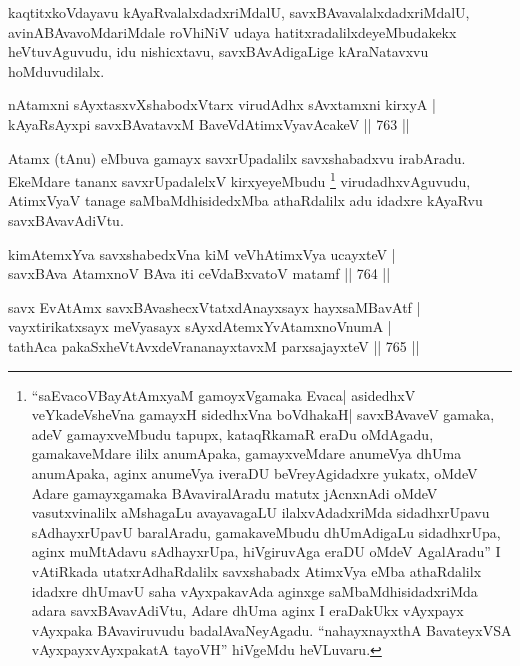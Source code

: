 \begin{artha}
kaqtitxkoVdayavu kAyaRvalalxdadxriMdalU, savxBAvavalalxdadxriMdalU, avinABAvavoMdariMdale roVhiNiV udaya hatitxradalilxdeyeMbudakekx heVtuvAguvudu, idu nishicxtavu, savxBAvAdigaLige kAraNatavxvu hoMduvudilalx.
\end{artha}


\begin{shl}
nA\s \s tamxni sAyxtasxvXshabodxV\s tarx virudAdhx sAvxtamxni kirxyA | \\
kAyaRsAyxpi savxBAvatavxM BaveVdAtimxVyavAcakeV \hfill||  763 || 
\end{shl}

\begin{artha}
Atamx (tAnu) eMbuva gamayx savxrUpadalilx savxshabadxvu irabAradu. EkeMdare tananx savxrUpadalelxV kirxyeyeMbudu \footnote{``saEvacoVBayAtAmx\s yaM gamoyxVgamaka Evaca| asidedhxV veYkadeVsheVna gamayxH sidedhxVna boVdhakaH| savxBAvaveV gamaka, adeV gamayxveMbudu tapupx, kataqRkamaR eraDu oMdAgadu, gamakaveMdare ililx anumApaka, gamayxveMdare anumeVya dhUma anumApaka, aginx anumeVya iveraDU beVreyAgidadxre yukatx, oMdeV Adare gamayxgamaka BAvaviralAradu matutx jAcnxnAdi oMdeV vasutxvinalilx aMshagaLu avayavagaLU ilalxvAdadxriMda sidadhxrUpavu sAdhayxrUpavU baralAradu, gamakaveMbudu dhUmAdigaLu sidadhxrUpa, aginx muMtAdavu sAdhayxrUpa, hiVgiruvAga eraDU oMdeV AgalAradu'' I vAtiRkada utatxrAdhaRdalilx savxshabadx AtimxVya eMba athaRdalilx idadxre dhUmavU saha vAyxpakavAda aginxge saMbaMdhisidadxriMda adara savxBAvavAdiVtu, Adare dhUma aginx I eraDakUkx vAyxpayx vAyxpaka BAvaviruvudu badalAvaNeyAgadu. ``nahayxnayxthA BavateyxVSA vAyxpayxvAyxpakatA tayoVH'' hiVgeMdu heVLuvaru.} virudadhxvAguvudu, AtimxVyaV tanage saMbaMdhisidedxMba athaRdalilx adu idadxre kAyaRvu savxBAvavAdiVtu.
\end{artha}


\begin{shl}
kimAtemxYva savxshabedxVna kiM veVhA\s \s timxVya ucayxteV | \\
savxBAva AtamxnoV BAva iti ceVdaBxvatoV matamf \hfill||  764 ||  
\end{shl}
				
\begin{shl}
savx EvA\s \s tAmx savxBAvashecxVtatxdA\s nayxsayx hayxsaMBavAtf | \\
vayxtirikatxsayx meVyasayx sAyxdAtemxYvA\s \s tamxnoV\s numA | \\
tathAca pakaSxheVtAvxdeVrananayxtavxM parxsajayxteV \hfill||  765 ||  
\end{shl}

